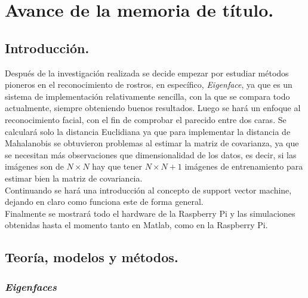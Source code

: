 \documentclass[letterpaper,12pt]{article}
\begin{document}
\newpage
\section{Avance de la memoria de título.}

\subsection{Introducción.}

Después de la investigación realizada se decide empezar por estudiar  métodos pioneros en el reconocimiento de rostros, en específico, \emph{Eigenface}, ya que es un sistema de implementación relativamente sencilla, con la que se compara todo actualmente, siempre obteniendo buenos resultados.
Luego se hará un enfoque al reconocimiento facial, con el fin de comprobar el parecido entre dos caras. Se calculará solo la distancia Euclidiana ya que para implementar la distancia de Mahalanobis se obtuvieron problemas al estimar la matriz de covarianza, ya que se necesitan más observaciones que dimensionalidad de los datos, es decir, si las imágenes son de $N\times N$ hay que tener $N\times N+1$ imágenes de entrenamiento para estimar bien la matriz de covariancia.\\
Continuando se hará una introducción al concepto de support vector machine, dejando en claro como funciona este de forma general. \\
 Finalmente se mostrará todo el hardware de la Raspberry Pi y las simulaciones obtenidas hasta el momento tanto en Matlab, como en la Raspberry Pi.


\subsection{Teoría, modelos y métodos.}
\subsubsection{\emph{Eigenfaces}}
\end{document}
